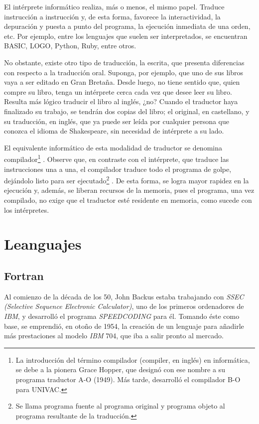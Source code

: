 \documentclass[twoside,twocolumn]{article}
\begin{document}
El intérprete informático realiza, más o menos, el
mismo papel. Traduce instrucción a instrucción y, de
esta forma, favorece la interactividad, la depuración y
puesta a punto del programa, la ejecución inmediata
de una orden, etc. Por ejemplo, entre los lenguajes que
suelen ser interpretados, se encuentran BASIC, LOGO, Python, Ruby, entre otros.

No obstante, existe otro tipo de traducción, la escrita, que presenta diferencias con respecto a la traducción oral. Suponga, por ejemplo, que uno de sus libros
vaya a ser editado en Gran Bretaña. Desde luego, no
tiene sentido que, quien compre su libro, tenga un
intérprete cerca cada vez que desee leer su libro. Resulta más lógico traducir el libro al inglés, ¿no? Cuando el
traductor haya finalizado su trabajo, se tendrán dos
copias del libro; el original, en castellano, y su traducción, en inglés, que ya puede ser leída por cualquier
persona que conozca el idioma de Shakespeare, sin
necesidad de intérprete a su lado.

El equivalente informático de esta modalidad de
traductor se denomina compilador\footnote{La introducción del término compilador (compiler, en inglés) en informática, se debe a la pionera Grace Hopper, que designó con ese nombre a su programa traductor A-O (1949). Más tarde, desarrolló el compilador B-O para UNIVAC.} . Observe que, en
contraste con el intérprete, que traduce las instrucciones una a una, el compilador traduce todo el programa
de golpe, dejándolo listo para ser ejecutado\footnote{Se llama programa fuente al programa original y programa objeto al programa resultante de la traducción.} . De esta
forma, se logra mayor rapidez en la ejecución y, además, se liberan recursos de la memoria, pues el programa, una vez compilado, no exige que el traductor esté
residente en memoria, como sucede con los intérpretes.







\section{Leanguajes}

\subsection{Fortran}

Al comienzo de la década de los 50, John Backus
estaba trabajando con \textit{SSEC (Selective Sequence Electronic Calculator)}, uno de los primeros ordenadores de
\textit{\textit{IBM}}, y desarrolló el programa \textit{SPEEDCODING} para él.
Tomando éste como base, se emprendió, en otoño de
1954, la creación de un lenguaje para añadirle más
prestaciones al modelo \textit{IBM} 704, que iba a salir pronto
al mercado.
\end{document}
